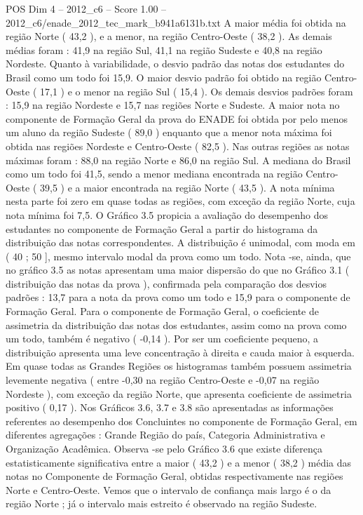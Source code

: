 \begin{textsample}{POS Dim 4 – 2012\_c6 – Score 1.00 – 2012\_c6/enade\_2012\_tec\_mark\_b941a6131b.txt}
A maior média foi obtida na região Norte ( 43,2 ), e a menor, na região Centro-Oeste ( 38,2 ).
As demais médias foram : 41,9 na região Sul, 41,1 na região Sudeste e 40,8 na região Nordeste.
Quanto à variabilidade, o desvio padrão das notas dos estudantes do Brasil como um todo foi 15,9.
O maior desvio padrão foi obtido na região Centro-Oeste ( 17,1 ) e o menor na região Sul ( 15,4 ).
Os demais desvios padrões foram : 15,9 na região Nordeste e 15,7 nas regiões Norte e Sudeste.
A maior nota no componente de Formação Geral da prova do ENADE foi obtida por pelo menos um aluno da região Sudeste ( 89,0 ) enquanto que a menor nota máxima foi obtida nas regiões Nordeste e Centro-Oeste ( 82,5 ).
Nas outras regiões as notas máximas foram : 88,0 na região Norte e 86,0 na região Sul.
A mediana do Brasil como um todo foi 41,5, sendo a menor mediana encontrada na região Centro-Oeste ( 39,5 ) e a maior encontrada na região Norte ( 43,5 ).
A nota mínima nesta parte foi zero em quase todas as regiões, com exceção da região Norte, cuja nota mínima foi 7,5.
O Gráfico 3.5 propicia a avaliação do desempenho dos estudantes no componente de Formação Geral a partir do histograma da distribuição das notas correspondentes.
A distribuição é unimodal, com moda em ( 40 ; 50 ], mesmo intervalo modal da prova como um todo.
Nota -se, ainda, que no gráfico 3.5 as notas apresentam uma maior dispersão do que no Gráfico 3.1 ( distribuição das notas da prova ), confirmada pela comparação dos desvios padrões : 13,7 para a nota da prova como um todo e 15,9 para o componente de Formação Geral.
Para o componente de Formação Geral, o coeficiente de assimetria da distribuição das notas dos estudantes, assim como na prova como um todo, também é negativo ( -0,14 ).
Por ser um coeficiente pequeno, a distribuição apresenta uma leve concentração à direita e cauda maior à esquerda.
Em quase todas as Grandes Regiões os histogramas também possuem assimetria levemente negativa ( entre -0,30 na região Centro-Oeste e -0,07 na região Nordeste ), com exceção da região Norte, que apresenta coeficiente de assimetria positivo ( 0,17 ).
Nos Gráficos 3.6, 3.7 e 3.8 são apresentadas as informações referentes ao desempenho dos Concluintes no componente de Formação Geral, em diferentes agregações : Grande Região do país, Categoria Administrativa e Organização Acadêmica.
Observa -se pelo Gráfico 3.6 que existe diferença estatisticamente significativa entre a maior ( 43,2 ) e a menor ( 38,2 ) média das notas no Componente de Formação Geral, obtidas respectivamente nas regiões Norte e Centro-Oeste.
Vemos que o intervalo de confiança mais largo é o da região Norte ; já o intervalo mais estreito é observado na região Sudeste.

\end{textsample}
